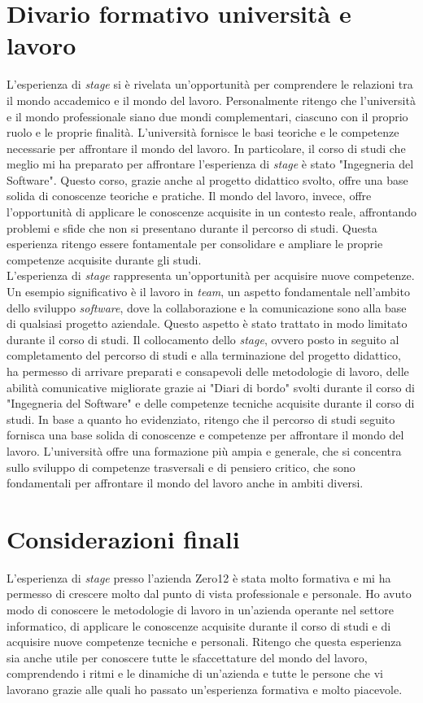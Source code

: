 \section{Divario formativo università e lavoro}
L'esperienza di \textit{stage} si è rivelata un'opportunità per comprendere le relazioni tra il mondo accademico e il mondo del lavoro. Personalmente ritengo che l'università e il mondo professionale siano due mondi complementari, ciascuno con il proprio ruolo e le proprie finalità. L'università fornisce le basi teoriche e le competenze necessarie per affrontare il mondo del lavoro. In particolare, il corso di studi che meglio mi ha preparato per affrontare l'esperienza di \textit{stage} è stato "Ingegneria del Software". Questo corso, grazie anche al progetto didattico svolto, offre una base solida di conoscenze teoriche e pratiche. Il mondo del lavoro, invece, offre l'opportunità di applicare le conoscenze acquisite in un contesto reale, affrontando problemi e sfide che non si presentano durante il percorso di studi.  Questa esperienza ritengo essere fontamentale per consolidare e ampliare le proprie competenze acquisite durante gli studi. \\
L'esperienza di \textit{stage} rappresenta un'opportunità per acquisire nuove competenze. Un esempio significativo è il lavoro in \textit{team}, un aspetto fondamentale nell'ambito dello sviluppo \textit{software}, dove la collaborazione e la comunicazione sono alla base di qualsiasi progetto aziendale. Questo aspetto è stato trattato in modo limitato durante il corso di studi. Il collocamento dello \textit{stage}, ovvero posto in seguito al completamento del percorso di studi e alla terminazione del progetto didattico, ha permesso di arrivare preparati e consapevoli delle metodologie di lavoro, delle abilità comunicative migliorate grazie ai "Diari di bordo" svolti durante il corso di "Ingegneria del Software" e delle competenze tecniche acquisite durante il corso di studi. 
In base a quanto ho evidenziato, ritengo che il percorso di studi seguito fornisca una base solida di conoscenze e competenze per affrontare il mondo del lavoro. L'università offre una formazione più ampia e generale, che si concentra sullo sviluppo di competenze trasversali e di pensiero critico, che sono fondamentali per affrontare il mondo del lavoro anche in ambiti diversi. 
\section{Considerazioni finali}
L'esperienza di \textit{stage} presso l'azienda Zero12 è stata molto formativa e mi ha permesso di crescere molto dal punto di vista professionale e personale. Ho avuto modo di conoscere le metodologie di lavoro in un'azienda operante nel settore informatico, di applicare le conoscenze acquisite durante il corso di studi e di acquisire nuove competenze tecniche e personali. Ritengo che questa esperienza sia anche utile per conoscere tutte le sfaccettature del mondo del lavoro, comprendendo i ritmi e le dinamiche di un'azienda e tutte le persone che vi lavorano grazie alle quali ho passato un'esperienza formativa e molto piacevole.

